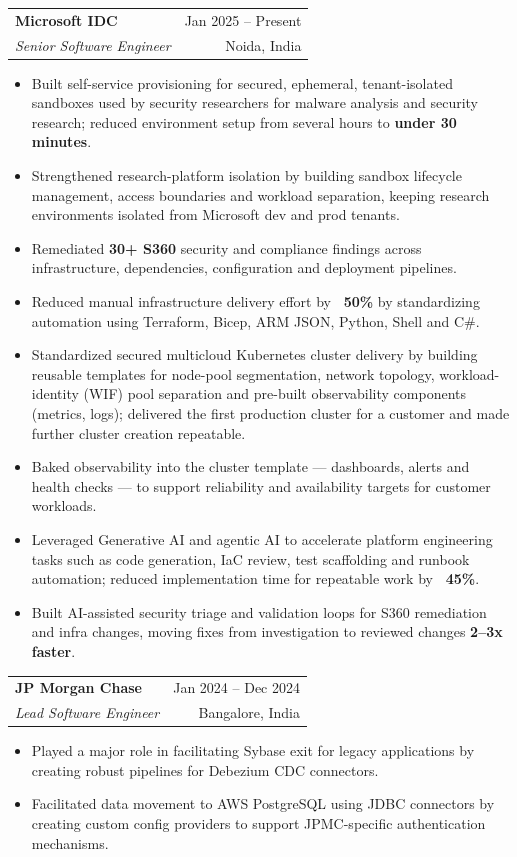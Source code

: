 \documentclass[letterpaper,11pt]{article}
\makeatletter
\newcommand{\resumeItem}[1]{
  \item\small{
    {#1 \vspace{-1pt}}
  }
}
\newcommand{\resumeSubheading}[4]{
  \vspace{-1pt}\item
    \begin{tabular*}{\textwidth}[t]{l@{\extracolsep{\fill}}r}
      \textbf{#1} & {\color{dark-grey}\small #2}\vspace{1pt}\\ %
      \textit{#3} & {\color{dark-grey} \small #4}\\ %
    \end{tabular*}\vspace{-4pt}
}
\newcommand{\resumeItemListStart}{\begin{itemize}}
\newcommand{\resumeItemListEnd}{\end{itemize}\vspace{0pt}}
\makeatother
\begin{document}
    \resumeSubheading
      {Microsoft IDC}{Jan 2025 -- Present}
      {Senior Software Engineer}{Noida, India}
      \resumeItemListStart
        \resumeItem{Built self-service provisioning for secured, ephemeral, tenant-isolated sandboxes used by security researchers for malware analysis and security research; reduced environment setup from several hours to \textbf{under 30 minutes}.}
        \resumeItem{Strengthened research-platform isolation by building sandbox lifecycle management, access boundaries and workload separation, keeping research environments isolated from Microsoft dev and prod tenants.}
        \resumeItem{Remediated \textbf{30+ S360} security and compliance findings across infrastructure, dependencies, configuration and deployment pipelines.}
        \resumeItem{Reduced manual infrastructure delivery effort by \textbf{~50\%} by standardizing automation using Terraform, Bicep, ARM JSON, Python, Shell and C\#.}
        \resumeItem{Standardized secured multicloud Kubernetes cluster delivery by building reusable templates for node-pool segmentation, network topology, workload-identity (WIF) pool separation and pre-built observability components (metrics, logs); delivered the first production cluster for a customer and made further cluster creation repeatable.}
        \resumeItem{Baked observability into the cluster template --- dashboards, alerts and health checks --- to support reliability and availability targets for customer workloads.}
        \resumeItem{Leveraged Generative AI and agentic AI to accelerate platform engineering tasks such as code generation, IaC review, test scaffolding and runbook automation; reduced implementation time for repeatable work by \textbf{~45\%}.}
        \resumeItem{Built AI-assisted security triage and validation loops for S360 remediation and infra changes, moving fixes from investigation to reviewed changes \textbf{2--3x faster}.}
      \resumeItemListEnd

    \resumeSubheading
      {JP Morgan Chase}{Jan 2024 -- Dec 2024}
      {Lead Software Engineer}{Bangalore, India}
      \resumeItemListStart
        \resumeItem{Played a major role in facilitating Sybase exit for legacy applications by creating robust pipelines for Debezium CDC connectors.}
        \resumeItem{Facilitated data movement to AWS PostgreSQL using JDBC connectors by creating custom config providers to support JPMC-specific authentication mechanisms.}
      \resumeItemListEnd
\end{document}
